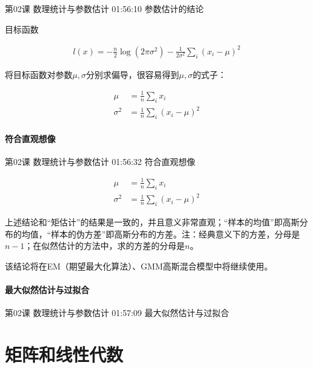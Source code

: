 \documentclass[UTF8]{ctexbook}
\begin{document}
第02课 数理统计与参数估计 01:56:10 参数估计的结论

目标函数

\begin{equation}
\begin{aligned}
l(x)=-\frac{n}{2} \log (2\pi \sigma^{2}) - \frac{1}{2 \sigma^{2}}\sum_{i}(x_{i}-\mu)^{2}
\end{aligned}
\end{equation}

将目标函数对参数$\mu,\sigma$分别求偏导，很容易得到$\mu,\sigma$的式子：

\begin{equation}
\begin{aligned}
\mu &= \frac{1}{n} \sum_{i} x_{i} \\
\sigma^{2} &=\frac{1}{n}\sum_{i} (x_{i}-\mu)^{2}
\end{aligned}
\end{equation}

\subsubsection{符合直观想像}

第02课 数理统计与参数估计 01:56:32 符合直观想像

\begin{equation}
\begin{aligned}
\mu &= \frac{1}{n} \sum_{i} x_{i} \\
\sigma^{2} &=\frac{1}{n}\sum_{i} (x_{i}-\mu)^{2}
\end{aligned}
\end{equation}

上述结论和“矩估计”的结果是一致的，并且意义非常直观；“样本的均值”即高斯分布的均值，“样本的伪方差”即高斯分布的方差。注：经典意义下的方差，分母是$n-1$；在似然估计的方法中，求的方差的分母是$n$。

该结论将在EM（期望最大化算法）、GMM高斯混合模型中将继续使用。

\subsubsection{最大似然估计与过拟合}

第02课 数理统计与参数估计 01:57:09 最大似然估计与过拟合

\newpage

\chapter{矩阵和线性代数}
\end{document}
